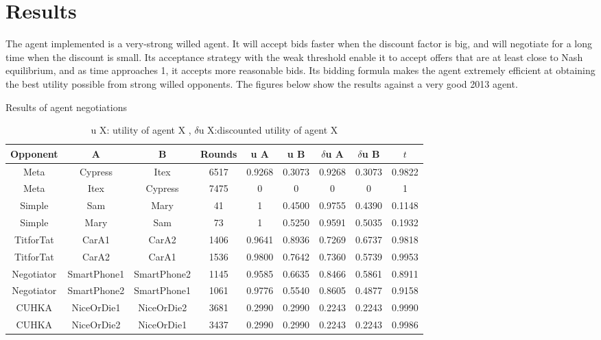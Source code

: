 \documentclass[html]{report}    %
\begin{document}
\section{Results}

The agent implemented is a very-strong willed agent. It will accept bids faster when the discount factor is big, and will negotiate for a long time when the discount is small. Its acceptance strategy with the weak threshold enable it to accept offers that are at least close to Nash equilibrium, and as time approaches 1, it accepts more reasonable bids. Its bidding formula makes the agent extremely efficient at obtaining the best utility possible from strong willed opponents. The figures below show the results against a very good 2013 agent.

\begin{table}[ht] 

\centering %
\caption{Results of agent negotiations} %
\begin{tabular}{ccccccccc} %
\hline\hline %
 Opponent & A  &  B & Rounds & u A & u B & $\delta$u A & $\delta$u B & $t$\\ [0.5ex] %
\hline
\hline %
Meta&Cypress&Itex&6517&0.9268&0.3073&0.9268&0.3073&0.9822\\
Meta&Itex&Cypress&7475&0&0&0&0&1\\
Simple&Sam&Mary&41&1&0.4500&0.9755&0.4390&0.1148\\
Simple&Mary&Sam&73&1&0.5250&0.9591&0.5035&0.1932\\ 
TitforTat&CarA1&CarA2&1406&0.9641&0.8936&0.7269&0.6737&0.9818\\
TitforTat&CarA2&CarA1&1536&0.9800&0.7642&0.7360&0.5739&0.9953\\
Negotiator&SmartPhone1&SmartPhone2&1145&0.9585&0.6635&0.8466&0.5861&0.8911\\
Negotiator&SmartPhone2&SmartPhone1&1061&0.9776&0.5540&0.8605&0.4877&0.9158\\
CUHKA&NiceOrDie1&NiceOrDie2&3681&0.2990&0.2990&0.2243&0.2243&0.9990\\
CUHKA&NiceOrDie2&NiceOrDie1&3437&0.2990&0.2990&0.2243&0.2243&0.9986\\
[1ex] %
\hline %
\end{tabular} 
\caption{u X: utility of agent X , $\delta$u X:discounted utility of agent X} %
\label{table:NegoSimpleresults} %
\end{table} 
\end{document}
